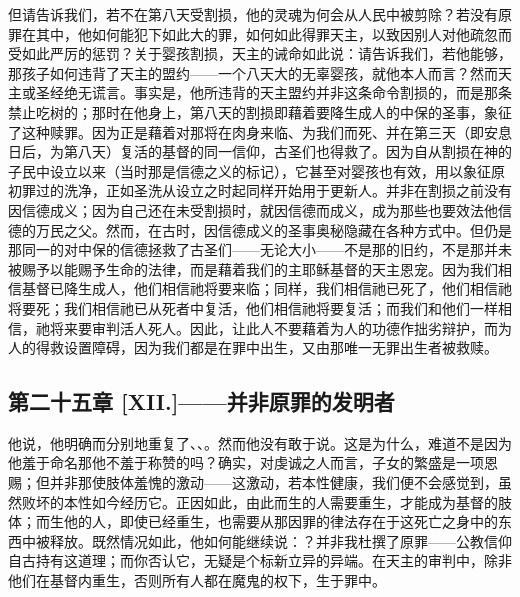 但请告诉我们，若不在第八天受割损，他的灵魂为何会从人民中被剪除？若没有原罪在其中，他如何能犯下如此大的罪，如何如此得罪天主，以致因别人对他疏忽而受如此严厉的惩罚？关于婴孩割损，天主的诫命如此说：请告诉我们，若他能够，那孩子如何违背了天主的盟约——一个八天大的无辜婴孩，就他本人而言？然而天主或圣经绝无谎言。事实是，他所违背的天主盟约并非这条命令割损的，而是那条禁止吃树的；那时在他身上，第八天的割损即藉着要降生成人的中保的圣事，象征了这种赎罪。因为正是藉着对那将在肉身来临、为我们而死、并在第三天（即安息日后，为第八天）复活的基督的同一信仰，古圣们也得救了。因为自从割损在神的子民中设立以来（当时那是信德之义的标记），它甚至对婴孩也有效，用以象征原初罪过的洗净，正如圣洗从设立之时起同样开始用于更新人。并非在割损之前没有因信德成义；因为自己还在未受割损时，就因信德而成义，成为那些也要效法他信德的万民之父。然而，在古时，因信德成义的圣事奥秘隐藏在各种方式中。但仍是那同一的对中保的信德拯救了古圣们——无论大小——不是那的旧约，不是那并未被赐予以能赐予生命的法律，而是藉着我们的主耶稣基督的天主恩宠。因为我们相信基督已降生成人，他们相信祂将要来临；同样，我们相信祂已死了，他们相信祂将要死；我们相信祂已从死者中复活，他们相信祂将要复活；而我们和他们一样相信，祂将来要审判活人死人。因此，让此人不要藉着为人的功德作拙劣辩护，而为人的得救设置障碍，因为我们都是在罪中出生，又由那唯一无罪出生者被救赎。\par


\subsection{第二十五章 [XII.]——并非原罪的发明者}

他说，他明确而分别地重复了、、。然而他没有敢于说。这是为什么，难道不是因为他羞于命名那他不羞于称赞的吗？确实，对虔诚之人而言，子女的繁盛是一项恩赐；但并非那使肢体羞愧的激动——这激动，若本性健康，我们便不会感觉到，虽然败坏的本性如今经历它。正因如此，由此而生的人需要重生，才能成为基督的肢体；而生他的人，即使已经重生，也需要从那因罪的律法存在于这死亡之身中的东西中被释放。既然情况如此，他如何能继续说：？并非我杜撰了原罪——公教信仰自古持有这道理；而你否认它，无疑是个标新立异的异端。在天主的审判中，除非他们在基督内重生，否则所有人都在魔鬼的权下，生于罪中。\par

